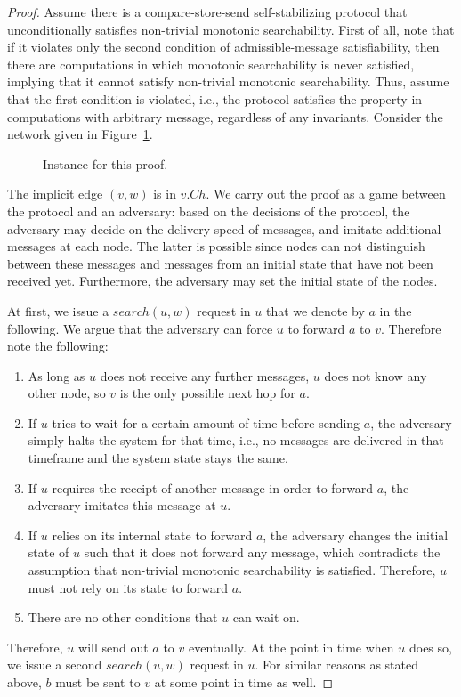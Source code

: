 \documentclass[a4paper,USenglish]{lipics}
\begin{document}
\begin{proof}
  Assume there is a compare-store-send self-stabilizing protocol that unconditionally satisfies non-trivial monotonic searchability.
  First of all, note that if it violates only the second condition of admissible-message satisfiability, then there are computations in which monotonic searchability is never satisfied, implying that it cannot satisfy non-trivial monotonic searchability.
  Thus, assume that the first condition is violated, i.e., the protocol satisfies the property in computations with arbitrary message, regardless of any invariants.
  Consider the network given in Figure~\ref{fig:no_corrupt}.
  \begin{figure}[h]
    \centering
	\caption{Instance for this proof.}\label{fig:no_corrupt}
 \end{figure}
 
 The implicit edge $(v,w)$ is in $v.Ch$.
 We carry out the proof as a game between the protocol and an adversary: based on the decisions of the protocol,  the adversary may decide on the delivery speed of messages, and imitate additional messages at each node.
 The latter is possible since nodes can not distinguish between these messages and messages from an initial state that have not been received yet.
 Furthermore, the adversary may set the initial state of the nodes.
 
 At first, we issue a $search(u,w)$ request in $u$ that we denote by $a$ in the following.
 We argue that the adversary can force $u$ to forward $a$ to $v$.
 Therefore note the following:
 \begin{enumerate}
  \item As long as $u$ does not receive any further messages, $u$ does not know any other node, so $v$ is the only possible next hop for $a$.
  \item If $u$ tries to wait for a certain amount of time before sending $a$, the adversary simply halts the system for that time, i.e., no messages are delivered in that timeframe and the system state stays the same.
  \item If $u$ requires the receipt of another message in order to forward $a$, the adversary imitates this message at $u$.
  \item If $u$ relies on its internal state to forward $a$, the adversary changes the initial state of $u$ such that it does not forward any message, which contradicts the assumption that non-trivial monotonic searchability is satisfied.
  Therefore, $u$ must not rely on its state to forward $a$.
  \item There are no other conditions that $u$ can wait on.
 \end{enumerate}
 Therefore, $u$ will send out $a$ to $v$ eventually. At the point in time when $u$ does so, we issue a second $search(u,w)$ request in $u$.
 For similar reasons as stated above, $b$ must be sent to $v$ at some point in time as well.
 

\end{proof}
\end{document}
